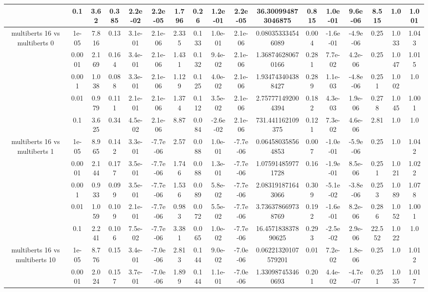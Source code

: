 \begin{tabular}{|c|c|c|c|c|c|c|c|c|c|c|c|c|c|c|c|c|}
 & 0.1 & 3.62 & 0.385 & 2.2e-02 & 2.2e-05 & 1.796 & 0.26 & 1.2e-01 & 2.2e-05 & 36.300994873046875 & 0.815 & 1.0e-01 & 9.6e-06 & 8.515 & 1.0 & 1.001 \\
\hline
\multirow{5}{*}{multiberts 16 vs multiberts 0} & 1e-05 & 7.816 & 0.13 & 3.1e-01 & 2.1e-06 & 2.335 & 0.133 & 1.0e-01 & 2.1e-06 & 0.080353334546089 & 0.004 & -1.6e-01 & -4.9e-06 & 0.25 & 1.033 & 1.043 \\
 & 0.0001 & 2.169 & 0.164 & 3.4e-01 & 2.1e-06 & 1.431 & 0.132 & 9.4e-02 & 2.1e-06 & 1.368746280670166 & 0.281 & 7.7e-02 & 4.2e-06 & 0.25 & 1.047 & 1.015 \\
 & 0.001 & 1.038 & 0.088 & 3.3e-01 & 2.1e-06 & 1.129 & 0.125 & 4.0e-02 & 2.1e-06 & 1.934743404388427 & 0.289 & 1.1e-03 & -4.8e-06 & 0.251 & 1.002 & 1.0 \\
 & 0.01 & 0.979 & 0.111 & 2.1e-01 & 2.1e-06 & 1.374 & 0.112 & 3.5e-02 & 2.1e-06 & 2.757771492004394 & 0.182 & 4.3e-03 & 1.9e-06 & 0.278 & 1.045 & 1.001 \\
 & 0.1 & 3.625 & 0.34 & 4.5e-02 & 2.1e-06 & 8.87 & 0.084 & -2.6e-02 & 2.1e-06 & 731.441162109375 & 0.121 & 7.3e-02 & 4.6e-06 & 2.81 & 1.0 & 1.0 \\
\hline
\multirow{5}{*}{multiberts 16 vs multiberts 1} & 1e-05 & 8.965 & 0.142 & 3.3e-01 & -7.7e-06 & 2.57 & 0.088 & 1.0e-01 & -7.7e-06 & 0.064580358564853 & 0.007 & -1.0e-01 & -5.9e-06 & 0.25 & 1.0 & 1.042 \\
 & 0.0001 & 2.144 & 0.177 & 3.5e-01 & -7.7e-06 & 1.746 & 0.088 & 1.3e-01 & -7.7e-06 & 1.075914859771728 & 0.16 & -1.9e-01 & 8.5e-06 & 0.251 & 1.021 & 1.022 \\
 & 0.001 & 0.933 & 0.099 & 3.5e-01 & -7.7e-06 & 1.536 & 0.089 & 5.8e-02 & -7.7e-06 & 2.083191871643066 & 0.309 & -5.1e-02 & -3.8e-06 & 0.253 & 1.089 & 1.078 \\
 & 0.01 & 1.059 & 0.109 & 2.1e-01 & -7.7e-06 & 0.983 & 0.072 & 5.5e-02 & -7.7e-06 & 3.736378669738769 & 0.192 & -1.6e-01 & 8.2e-06 & 0.286 & 1.052 & 1.001 \\
 & 0.1 & 2.241 & 0.106 & 7.5e-02 & -7.7e-06 & 3.381 & 0.065 & 1.0e-02 & -7.7e-06 & 16.457183837890625 & 0.293 & -2.5e-02 & 2.9e-06 & 22.552 & 1.022 & 1.0 \\
\hline
\multirow{5}{*}{multiberts 16 vs multiberts 10} & 1e-05 & 8.776 & 0.15 & 3.4e-01 & -7.0e-06 & 2.813 & 0.144 & 9.0e-02 & -7.0e-06 & 0.06221320107579201 & 0.01 & 7.2e-02 & 1.8e-06 & 0.25 & 1.0 & 1.012 \\
 & 0.0001 & 2.024 & 0.157 & 3.7e-01 & -7.0e-06 & 1.899 & 0.144 & 1.1e-01 & -7.0e-06 & 1.330987453460693 & 0.201 & 4.4e-02 & -4.7e-07 & 0.251 & 1.035 & 1.017 \\

\end{tabular}
